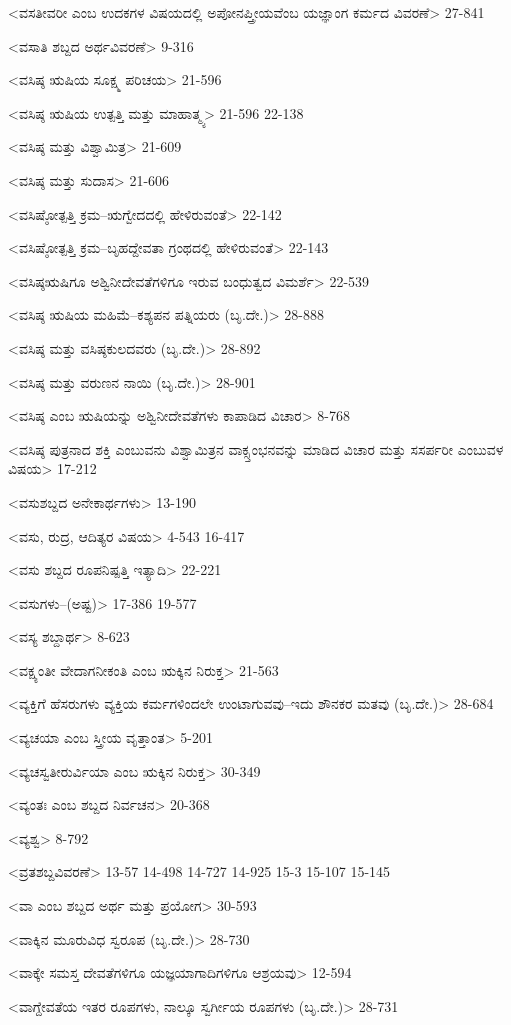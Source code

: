 <ವಸತೀವರೀ ಎಂಬ ಉದಕಗಳ ವಿಷಯದಲ್ಲಿ ಅಪೋನಪ್ತ್ರೀಯವೆಂಬ ಯಜ್ಞಾಂಗ ಕರ್ಮದ ವಿವರಣೆ>
27-841

<ವಸಾತಿ ಶಬ್ದದ ಅರ್ಥವಿವರಣೆ>
9-316

<ವಸಿಷ್ಠ ಋಷಿಯ ಸೂಕ್ಷ್ಮ ಪರಿಚಯ>
21-596

<ವಸಿಷ್ಠ ಋಷಿಯ ಉತ್ಪತ್ತಿ ಮತ್ತು ಮಾಹಾತ್ಮ್ಯ>
21-596 
22-138

<ವಸಿಷ್ಠ ಮತ್ತು ವಿಶ್ವಾಮಿತ್ರ>
21-609

<ವಸಿಷ್ಠ ಮತ್ತು ಸುದಾಸ>
21-606

<ವಸಿಷ್ಠೋತ್ಪತ್ತಿ ಕ್ರಮ–ಋಗ್ವೇದದಲ್ಲಿ ಹೇಳಿರುವಂತೆ>
22-142

<ವಸಿಷ್ಠೋತ್ಪತ್ತಿ ಕ್ರಮ–ಬೃಹದ್ದೇವತಾ ಗ್ರಂಥದಲ್ಲಿ ಹೇಳಿರುವಂತೆ>
22-143

<ವಸಿಷ್ಠಋಷಿಗೂ ಅಶ್ವಿನೀದೇವತೆಗಳಿಗೂ ಇರುವ ಬಂಧುತ್ವದ ವಿಮರ್ಶೆ>
22-539

<ವಸಿಷ್ಠ ಋಷಿಯ ಮಹಿಮೆ–ಕಶ್ಯಪನ ಪತ್ನಿಯರು (ಬೃ.ದೇ.)>
28-888

<ವಸಿಷ್ಠ ಮತ್ತು ವಸಿಷ್ಠಕುಲದವರು (ಬೃ.ದೇ.)>
28-892

<ವಸಿಷ್ಠ ಮತ್ತು ವರುಣನ ನಾಯಿ (ಬೃ.ದೇ.)>
28-901

<ವಸಿಷ್ಠ ಎಂಬ ಋಷಿಯನ್ನು ಅಶ್ವಿನೀದೇವತೆಗಳು ಕಾಪಾಡಿದ ವಿಚಾರ>
8-768

<ವಸಿಷ್ಠ ಪುತ್ರನಾದ ಶಕ್ತಿ ಎಂಬುವನು ವಿಶ್ವಾಮಿತ್ರನ ವಾಕ್ಸ್ತಂಭನವನ್ನು ಮಾಡಿದ ವಿಚಾರ ಮತ್ತು ಸಸರ್ಪರೀ ಎಂಬುವಳ ವಿಷಯ>
17-212

<ವಸುಶಬ್ದದ ಅನೇಕಾರ್ಥಗಳು>
13-190

<ವಸು, ರುದ್ರ, ಆದಿತ್ಯರ ವಿಷಯ>
4-543
16-417

<ವಸು ಶಬ್ದದ ರೂಪನಿಷ್ಪತ್ತಿ ಇತ್ಯಾದಿ>
22-221

<ವಸುಗಳು–(ಅಷ್ಟ)>
17-386
19-577

<ವಸ್ಯ ಶಬ್ದಾರ್ಥ>
8-623

<ವಕ್ಷ್ಯಂತೀ ವೇದಾಗನೀಕಂತಿ ಎಂಬ ಋಕ್ಕಿನ ನಿರುಕ್ತ>
21-563

<ವ್ಯಕ್ತಿಗೆ ಹೆಸರುಗಳು ವ್ಯಕ್ತಿಯ ಕರ್ಮಗಳಿಂದಲೇ ಉಂಟಾಗುವವು–ಇದು ಶೌನಕರ ಮತವು (ಬೃ.ದೇ.)>
28-684

<ವ್ಯಚಯಾ ಎಂಬ ಸ್ತ್ರೀಯ ವೃತ್ತಾಂತ>
5-201

<ವ್ಯಚಸ್ವತೀರುರ್ವಿಯಾ ಎಂಬ ಋಕ್ಕಿನ ನಿರುಕ್ತ>
30-349

<ವ್ಯಂತಃ ಎಂಬ ಶಬ್ದದ ನಿರ್ವಚನ>
20-368

<ವ್ಯಶ್ವ>
8-792

<ವ್ರತಶಬ್ದವಿವರಣೆ>
13-57 
14-498 
14-727
14-925 
15-3 
15-107
15-145

<ವಾ ಎಂಬ ಶಬ್ದದ ಅರ್ಥ ಮತ್ತು ಪ್ರಯೋಗ>
30-593

<ವಾಕ್ಕಿನ ಮೂರುವಿಧ ಸ್ವರೂಪ (ಬೃ.ದೇ.)>
28-730

<ವಾಕ್ಕೇ ಸಮಸ್ತ ದೇವತೆಗಳಿಗೂ ಯಜ್ಞಯಾಗಾದಿಗಳಿಗೂ ಆಶ್ರಯವು>
12-594

<ವಾಗ್ದೇವತೆಯ ಇತರ ರೂಪಗಳು, ನಾಲ್ಕೂ ಸ್ವರ್ಗೀಯ ರೂಪಗಳು (ಬೃ.ದೇ.)>
28-731

